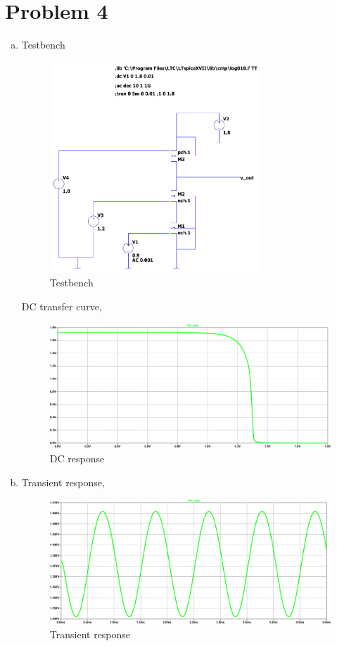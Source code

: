 \documentclass{article}
\begin{document}
\section{Problem 4}
\label{sec:org3a0d5f5}
\begin{enumerate}[(a)]
\item Testbench
\begin{figure}[H]
\centering
\includegraphics[height=300px]{img/q4/testbench.pdf}
\caption{\label{fig:testbench-q4}Testbench}
\end{figure}

DC transfer curve,
\begin{figure}[H]
\centering
\includegraphics[width=.9\linewidth]{img/q4/vout-vin-dc.pdf}
\caption{\label{fig:vout-vin-dc-q3}DC response}
\end{figure}

\item Transient response,

\begin{figure}[H]
\centering
\includegraphics[width=.9\linewidth]{img/q4/transient.pdf}
\caption{\label{fig:trans-q4}Transient response}
\end{figure}


\end{enumerate}
\end{document}
